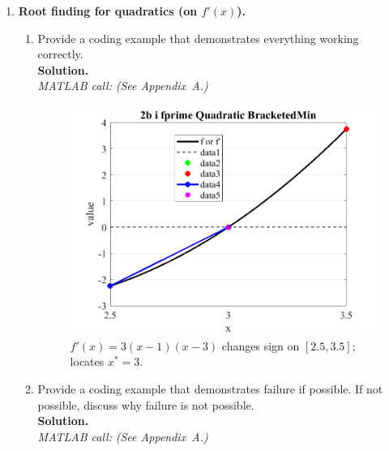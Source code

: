 \documentclass[11pt]{article}
\begin{document}
\begin{enumerate}[label=\textbf{\arabic*)}, leftmargin=2.2em]
\begin{enumerate}[label=\roman*)]
		\end{enumerate}
		
		\item \textbf{Root finding for quadratics (on $f'(x)$).}
		\begin{enumerate}[label=\roman*)]
			
			\item Provide a coding example that demonstrates everything working correctly.\\
			\textbf{Solution.}\\
			\textit{MATLAB call:} \emph{(See Appendix~A.)}
			
			\begin{figure}[H]\centering
				\includegraphics[width=0.78\linewidth]{plots/2b_i_fprime_Quadratic_BracketedMin.png}
				\caption{$f'(x)=3(x-1)(x-3)$ changes sign on $[2.5,3.5]$; locates $x^*=3$.}
			\end{figure}
			
			\item Provide a coding example that demonstrates failure if possible. If not possible, discuss why failure is not possible.\\
			\textbf{Solution.}\\
			\textit{MATLAB call:} \emph{(See Appendix~A.)}
			

\end{enumerate}
\end{enumerate}
\end{document}
